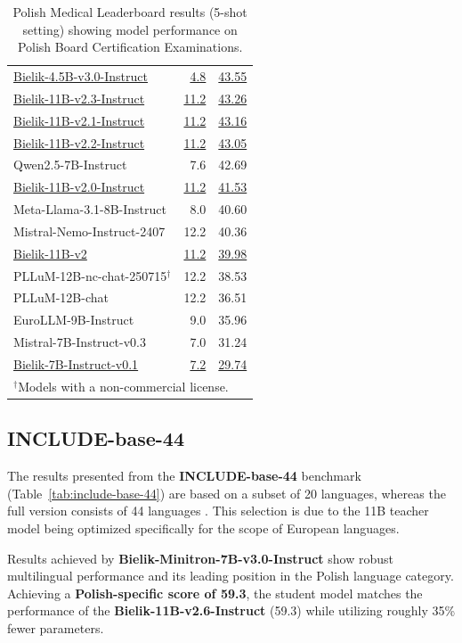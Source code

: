 \documentclass{article}
\begin{document}
\begin{table}[t]
\begin{tabular}{lrc}
    \underline{Bielik-4.5B-v3.0-Instruct} & \underline{4.8} & \underline{43.55} \\
    \underline{Bielik-11B-v2.3-Instruct} & \underline{11.2} & \underline{43.26} \\
    \underline{Bielik-11B-v2.1-Instruct} & \underline{11.2} & \underline{43.16} \\
    \underline{Bielik-11B-v2.2-Instruct} & \underline{11.2} & \underline{43.05} \\
    Qwen2.5-7B-Instruct & 7.6 & 42.69 \\
    \underline{Bielik-11B-v2.0-Instruct} & \underline{11.2} & \underline{41.53} \\
    Meta-Llama-3.1-8B-Instruct & 8.0 & 40.60 \\
    Mistral-Nemo-Instruct-2407 & 12.2 & 40.36 \\
    \underline{Bielik-11B-v2} & \underline{11.2} & \underline{39.98} \\
    PLLuM-12B-nc-chat-250715$^{\dagger}$ & 12.2 & 38.53 \\
    PLLuM-12B-chat & 12.2 & 36.51 \\
    EuroLLM-9B-Instruct & 9.0 & 35.96 \\
    Mistral-7B-Instruct-v0.3 & 7.0 & 31.24 \\
    \underline{Bielik-7B-Instruct-v0.1} & \underline{7.2} & \underline{29.74} \\
    \bottomrule
    \multicolumn{3}{l}{$^{\dagger}$Models with a non-commercial license.} \\
    \end{tabular}
    \caption{Polish Medical Leaderboard results (5-shot setting) showing model performance on Polish Board Certification Examinations.}
    \label{tab:medical-leaderboard}
\end{table}

\subsection{INCLUDE-base-44}
The results presented from the \textbf{INCLUDE-base-44} benchmark (Table~\ref{tab:include-base-44}) are based on a subset of 20 languages, whereas the full version consists of 44 languages \cite{romanou2024include}. This selection is due to the 11B teacher model being optimized specifically for the scope of European languages. 

Results achieved by \textbf{Bielik-Minitron-7B-v3.0-Instruct} show robust multilingual performance and its leading position in the Polish language category. Achieving a \textbf{Polish-specific score of 59.3}, the student model matches the performance of the \textbf{Bielik-11B-v2.6-Instruct} (59.3) while utilizing roughly 35\% fewer parameters.
\end{document}
